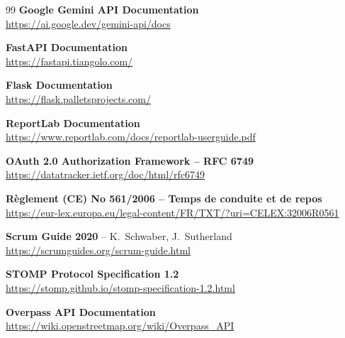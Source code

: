 \documentclass[12pt,a4paper]{report}
\begin{document}
\begin{thebibliography}{99}
\textbf{Google Gemini API Documentation}\\
\url{https://ai.google.dev/gemini-api/docs}

\textbf{FastAPI Documentation}\\
\url{https://fastapi.tiangolo.com/}

\textbf{Flask Documentation}\\
\url{https://flask.palletsprojects.com/}

\textbf{ReportLab Documentation}\\
\url{https://www.reportlab.com/docs/reportlab-userguide.pdf}

\textbf{OAuth 2.0 Authorization Framework -- RFC 6749}\\
\url{https://datatracker.ietf.org/doc/html/rfc6749}

\textbf{Règlement (CE) No 561/2006 -- Temps de conduite et de repos}\\
\url{https://eur-lex.europa.eu/legal-content/FR/TXT/?uri=CELEX:32006R0561}

\textbf{Scrum Guide 2020} -- K.~Schwaber, J.~Sutherland\\
\url{https://scrumguides.org/scrum-guide.html}

\textbf{STOMP Protocol Specification 1.2}\\
\url{https://stomp.github.io/stomp-specification-1.2.html}

\textbf{Overpass API Documentation}\\
\url{https://wiki.openstreetmap.org/wiki/Overpass\_API}

\end{thebibliography}
\end{document}
